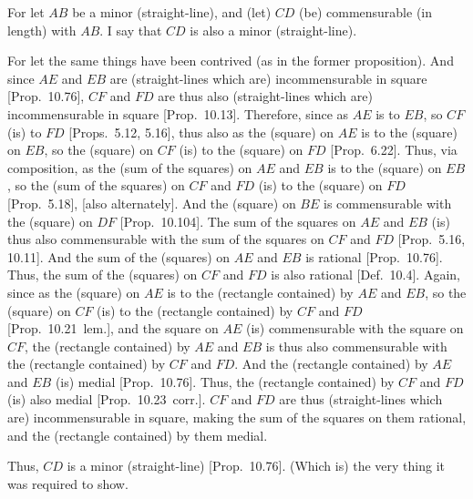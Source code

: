 \begin{Parallel}{}{}
{For let $AB$ be a minor (straight-line), and (let) $CD$ (be) commensurable
(in length) with $AB$. I say that $CD$ is also a minor (straight-line).

For let the same things have been contrived (as in the former proposition).
And since $AE$ and $EB$ are (straight-lines which are) incommensurable in square [Prop.~10.76], $CF$ and $FD$ are thus also
(straight-lines which are)  incommensurable in square [Prop.~10.13].
Therefore, since as $AE$ is to $EB$, so $CF$ (is) to $FD$ [Props.~5.12, 5.16], thus also
as the (square) on $AE$ is to the (square) on $EB$, so the (square)
on $CF$ (is) to the (square) on $FD$ [Prop.~6.22]. Thus, via composition,
as the (sum of the squares) on $AE$ and $EB$ is to the (square) on $EB$,
so the (sum of the squares) on $CF$ and $FD$  (is) to the (square) on $FD$  [Prop.~5.18], [also alternately]. And the
(square) on $BE$ is commensurable with the (square) on $DF$ [Prop.~10.104]. The sum of the squares on $AE$ and $EB$ (is) thus also commensurable with the sum of the squares
on $CF$ and $FD$ [Prop.~5.16, 10.11].  And the sum of the (squares) on
$AE$ and $EB$ is rational [Prop.~10.76].
Thus, the sum of the (squares) on $CF$ and $FD$ is also rational
[Def.~10.4]. Again, since as the (square) on $AE$
is to the (rectangle contained) by $AE$ and $EB$, so
the (square) on $CF$ (is) to the (rectangle contained) by
$CF$ and $FD$ [Prop.~10.21~lem.],
and the square on $AE$ (is) commensurable with the square on
$CF$, the (rectangle contained) by $AE$ and $EB$ is thus also commensurable
with the (rectangle contained) by $CF$ and $FD$. And the
(rectangle contained) by $AE$ and $EB$ (is) medial [Prop.~10.76].  Thus, the (rectangle contained) by
$CF$ and $FD$ (is) also medial [Prop.~10.23~corr.]. $CF$ and $FD$
are thus (straight-lines which are) incommensurable in square, making the sum of the
squares on them rational, and the (rectangle contained) by them
medial.

Thus, $CD$ is a minor (straight-line) [Prop.~10.76]. (Which is) the very thing it
was required to show.}
\end{Parallel}

